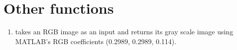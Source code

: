 


\pagebreak
\section{Other functions}
\begin{enumerate}

\item {} takes an RGB image as an input and returns its gray scale image using MATLAB's RGB coefficients (0.2989, 0.2989, 0.114).


\end{enumerate}



